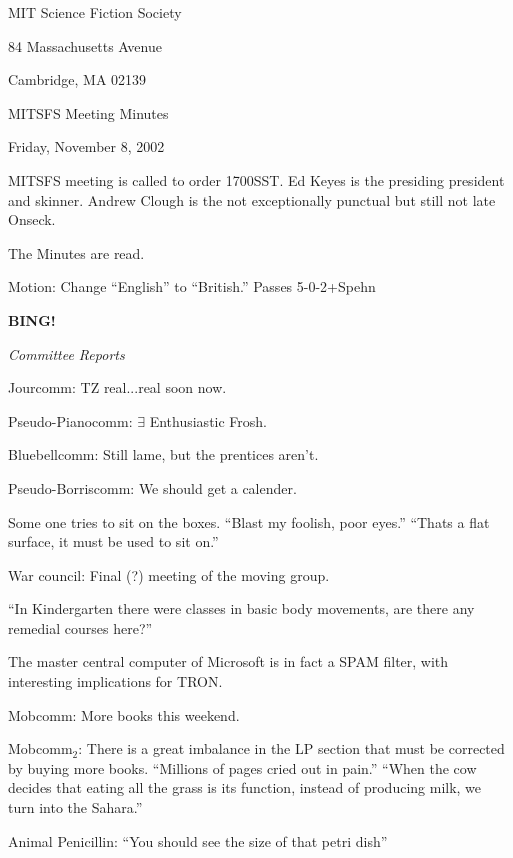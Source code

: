 \documentclass[12pt]{article}
\newcommand{\bing}{{\bf BING!} }
\newcommand{\goto}[1]{\bing \vskip 12pt \centerline{{\em{#1}}}}
\begin{document}
\begin{center}

MIT Science Fiction Society 

84 Massachusetts Avenue

Cambridge, MA 02139

\vspace{12pt}

MITSFS Meeting Minutes 

Friday, November 8, 2002

\end{center}

\vspace{18pt}

\setlength{\parskip}{6pt}

\noindent
MITSFS meeting is called to order 1700SST.  Ed Keyes is the presiding president and skinner.  Andrew Clough is the not exceptionally punctual but still not late Onseck.

The Minutes are read.

Motion:  Change ``English'' to ``British.'' Passes 5-0-2+Spehn

\goto{Committee Reports}

Jourcomm:  TZ real...real soon now.

Pseudo-Pianocomm: $ \exists $ Enthusiastic Frosh.

Bluebellcomm:   Still lame, but the prentices aren't.

Pseudo-Borriscomm:  We should get a calender.

Some one tries to sit on the boxes.  ``Blast my foolish, poor eyes.''  ``Thats a flat surface, it must be used to sit on.''

War council:  Final (?) meeting of the moving group.

``In Kindergarten there were classes in basic body movements, are there any remedial courses here?''

The master central computer of Microsoft is in fact a SPAM filter, with interesting implications for TRON.

Mobcomm:  More books this weekend.

Mobcomm$_{2}$:  There is a great imbalance in the LP section that must be corrected by buying more books.  ``Millions of pages cried out in pain.''  ``When the cow decides that eating all the grass is its function, instead of producing milk, we turn into the Sahara.''

Animal Penicillin:  ``You should see the size of that petri dish''
\end{document}

